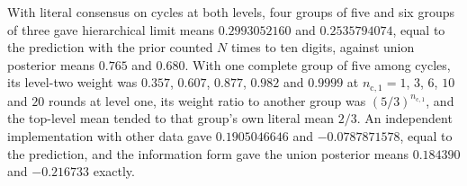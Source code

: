 \begin{numcheck}\label{chk:ren-literal}
With literal consensus on cycles at both levels, four groups of five and six groups of three gave hierarchical limit means $0.2993052160$ and $0.2535794074$, equal to the prediction with the prior counted $N$ times to ten digits, against union posterior means $0.765$ and $0.680$. With one complete group of five among cycles, its level-two weight was $0.357$, $0.607$, $0.877$, $0.982$ and $0.9999$ at $n_{\mathrm c,1}=1$, $3$, $6$, $10$ and $20$ rounds at level one, its weight ratio to another group was $(5/3)^{n_{\mathrm c,1}}$, and the top-level mean tended to that group's own literal mean $2/3$. An independent implementation with other data gave $0.1905046646$ and $-0.0787871578$, equal to the prediction, and the information form gave the union posterior means $0.184390$ and $-0.216733$ exactly.
\end{numcheck}

